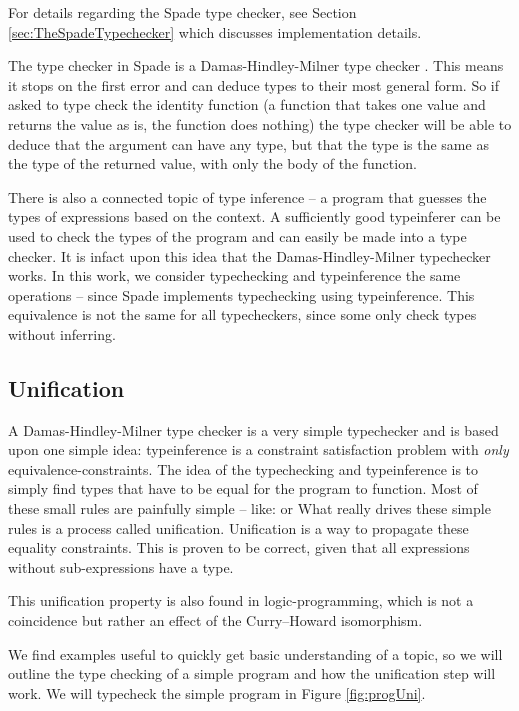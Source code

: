 For details regarding the Spade type checker, see Section \ref{sec:TheSpadeTypechecker} which discusses implementation details.

The type checker in Spade is a Damas-Hindley-Milner type checker \cite{src:DamasHindleyMilner}. This means it stops on the first error and can deduce types to their most general form. So if asked to type check the identity function (a function that takes one value and returns the value as is, the function does nothing) the type checker will be able to deduce that the argument can have any type, but that the type is the same as the type of the returned value, with only the body of the function.\cite{src:DamasHindleyMilner}

There is also a connected topic of type inference -- a program that guesses the types of expressions based on the context. A sufficiently good typeinferer can be used to check the types of the program and can easily be made into a type checker. It is infact upon this idea that the Damas-Hindley-Milner typechecker works. In this work, we consider typechecking and typeinference the same operations -- since Spade implements typechecking using typeinference. This equivalence is not the same for all typecheckers, since some only check types without inferring.

\subsection{Unification}
\label{sec:Unification}
A Damas-Hindley-Milner type checker is a very simple typechecker and is based upon one simple idea: typeinference is a constraint satisfaction problem with \textit{only} equivalence-constraints. The idea of the typechecking and typeinference is to simply find types that have to be equal for the program to function. Most of these small rules are painfully simple -- like:  or  What really drives these simple rules is a process called unification. Unification is a way to propagate these equality constraints. This is proven to be correct, given that all expressions without sub-expressions have a type.

This unification property is also found in logic-programming, which is not a coincidence but rather an effect of the Curry–Howard isomorphism. \cite{src:curryHowardIso}

We find examples useful to quickly get basic understanding of a topic, so we will outline the type checking of a simple program and how the unification step will work. We will typecheck the simple program in Figure \ref{fig:progUni}.

